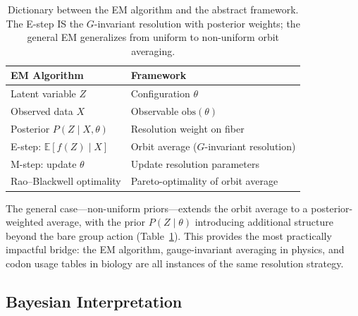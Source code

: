 \documentclass[11pt,a4paper]{article}
\newcommand{\E}{\mathbb{E}}
\begin{document}
\begin{table}[t]
  \centering
  \small
  \begin{tabular}{@{}ll@{}}
    \toprule
    \textbf{EM Algorithm} & \textbf{Framework} \\
    \midrule
    Latent variable $Z$ & Configuration $\theta$ \\
    Observed data $X$ & Observable $\mathrm{obs}(\theta)$ \\
    Posterior $P(Z \mid X, \theta)$ & Resolution weight on fiber \\
    E-step: $\E[f(Z) \mid X]$ & Orbit average ($G$-invariant resolution) \\
    M-step: update $\theta$ & Update resolution parameters \\
    Rao--Blackwell optimality & Pareto-optimality of orbit average \\
    \bottomrule
  \end{tabular}
  \caption{Dictionary between the EM algorithm and the abstract framework.  The
    E-step IS the $G$-invariant resolution with posterior weights; the general
    EM generalizes from uniform to non-uniform orbit averaging.}
  \label{tab:em-dictionary}
\end{table}

The general case---non-uniform priors---extends the orbit average to a
posterior-weighted average, with the prior $P(Z \mid \theta)$ introducing
additional structure beyond the bare group action
(Table~\ref{tab:em-dictionary}).  This provides the most practically impactful
bridge: the EM algorithm, gauge-invariant averaging in physics, and codon
usage tables in biology are all instances of the same resolution strategy.

\subsection{Bayesian Interpretation}
\label{sec:bridge-bayesian}
\end{document}
